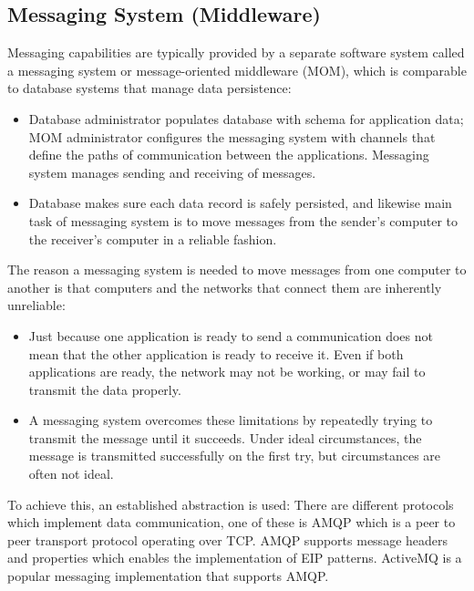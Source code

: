 \documentclass[../Main.tex]{subfiles}
\begin{document}
\subsection{Messaging System (Middleware)}
Messaging capabilities are typically provided by a separate software system called a messaging system or 
message-oriented middleware (MOM), which is comparable to database systems that manage data 
persistence:
\begin{itemize}
    \item Database administrator populates database with schema for application data; MOM administrator 
    configures the messaging system with channels that define the paths of communication between the 
    applications. Messaging system manages sending and receiving of messages.
    \item Database makes sure each data record is safely persisted, and likewise main task of messaging system 
    is to move messages from the sender's computer to the receiver's computer in a reliable fashion.
\end{itemize}
The reason a messaging system is needed to move messages from one computer to 
another is that computers and the networks that connect them are inherently unreliable:
\begin{itemize}
    \item Just because one application is ready to send a communication does not mean that the 
    other application is ready to receive it.
    Even if both applications are ready, the network may not be working, or may fail to 
    transmit the data properly.
    \item A messaging system overcomes these limitations by repeatedly trying to transmit the 
    message until it succeeds. Under ideal circumstances, the message is transmitted 
    successfully on the first try, but circumstances are often not ideal.
\end{itemize}
To achieve this, an established abstraction is used: 
There are different protocols which implement data communication, one
of these is AMQP which is a peer to peer transport protocol operating over TCP. AMQP supports message headers and properties
which enables the implementation of EIP patterns. ActiveMQ is a popular messaging implementation that supports AMQP.
\end{document}
